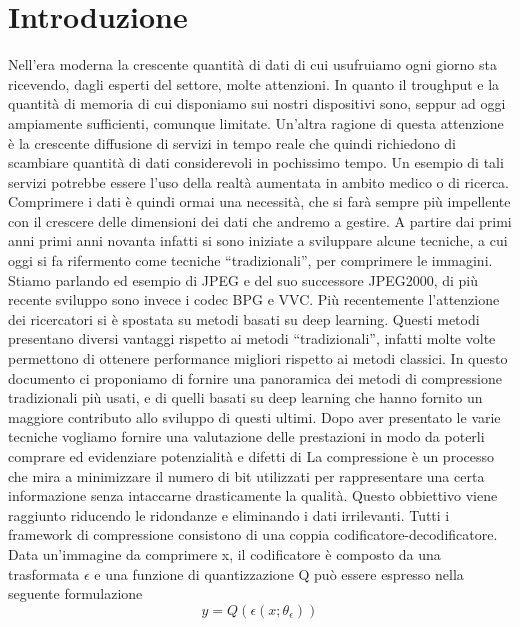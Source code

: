 \chapter*{Introduzione}
Nell’era moderna la crescente quantità di dati di cui usufruiamo ogni giorno sta ricevendo, dagli esperti del settore, molte attenzioni. In quanto il troughput e la quantità di memoria di cui disponiamo sui nostri dispositivi sono, seppur ad oggi ampiamente sufficienti, comunque limitate. Un’altra ragione di questa attenzione è la crescente diffusione di servizi in tempo reale che quindi richiedono di scambiare quantità di dati considerevoli in pochissimo tempo. Un esempio di tali servizi potrebbe essere l’uso della realtà aumentata in ambito medico o di ricerca. Comprimere i dati è quindi ormai una necessità, che si farà sempre più impellente con il crescere delle dimensioni dei dati che andremo a gestire.
A partire dai primi anni primi anni novanta infatti si sono iniziate a sviluppare alcune tecniche, a cui oggi si fa rifermento come tecniche “tradizionali”, per comprimere le immagini. Stiamo parlando ed esempio di JPEG e del suo successore JPEG2000, di più recente sviluppo sono invece i codec BPG e VVC.
Più recentemente l’attenzione dei ricercatori si è spostata su metodi basati su deep learning. Questi metodi presentano diversi vantaggi rispetto ai metodi “tradizionali”, infatti molte volte permettono di ottenere performance migliori rispetto ai metodi classici.
In questo documento ci proponiamo di fornire una panoramica dei metodi di compressione tradizionali più usati, e di quelli basati su deep learning che hanno fornito un maggiore contributo allo sviluppo di questi ultimi. Dopo aver presentato le varie tecniche vogliamo fornire una valutazione delle prestazioni in modo da poterli comprare ed evidenziare potenzialità e difetti di
La compressione è un processo che mira a minimizzare il numero di bit utilizzati per rappresentare una certa informazione senza intaccarne drasticamente la qualità. Questo obbiettivo viene raggiunto riducendo le ridondanze e eliminando i dati irrilevanti.
Tutti i framework di compressione consistono di una coppia codificatore-decodificatore. Data un’immagine da comprimere x, il codificatore è composto da una trasformata $\epsilon$ e una funzione di quantizzazione Q può essere espresso nella seguente formulazione\\
\begin{equation}\label{eq:eqCondificatore}
    y = Q(\epsilon (x;\theta_{\epsilon}))
\end{equation}
